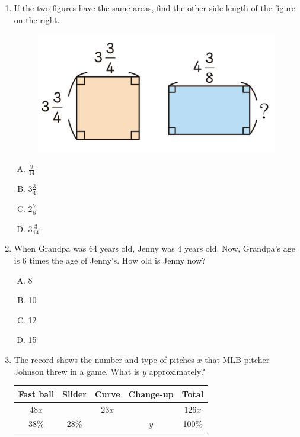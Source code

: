 \documentclass[11pt]{scrartcl}
\begin{document}
\begin{enumerate}
\newpage
\item If the two figures have the same areas, find the other side length of the figure on the right.
\begin{figure}[h]
    \centering
    \includegraphics{StarGen/0Figure/wmi-2020-6a-two-rectangle.png}
\end{figure}
\begin{enumerate}[(A)]
    \item $\frac{9}{14}$ \item $3\frac{3}{4}$ \item $2\frac{7}{8}$ \item $3\frac{3}{14}$
\end{enumerate}

\item When Grandpa was 64 years old, Jenny was 4 years old. Now, Grandpa's age is 6 times the age of Jenny's. How old is Jenny now?
\begin{enumerate}[(A)]
    \item 8 \item 10 \item 12 \item 15
\end{enumerate}

\item The record shows the number and type of pitches $x$ that MLB pitcher Johnson threw in a game. What is $y$ approximately?
\begin{center}
    \begin{tabular}{|c|c|c|c|c|}
    \hline
    Fast ball & Slider & Curve & Change-up & Total\\
    \hline
    $48x$ & & $23x$ & & $126x$\\
    \hline
    38\% & 28\% & & $y$ & 100\%\\
    \hline
    \end{tabular}
\end{center}


\end{enumerate}
\end{document}
